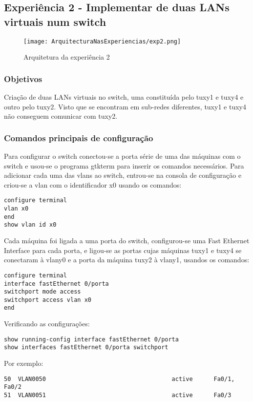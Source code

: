 \documentclass[a4paper]{article}
\begin{document}
\subsection{Experiência 2 - Implementar de duas LANs virtuais num switch}

\begin{figure}[h]
    \centering
    \texttt{[image: ArquitecturaNasExperiencias/exp2.png]}
    \caption{Arquitetura da experiência 2}
\end{figure}

\subsubsection{Objetivos}
Criação de duas LANs virtuais no switch, uma constituída pelo tuxy1 e tuxy4 e
outro pelo tuxy2. Visto que se encontram em sub-redes diferentes, tuxy1 e tuxy4
não conseguem comunicar com tuxy2.

\subsubsection{Comandos principais de configuração}
Para configurar o switch conectou-se a porta série de uma das máquinas com o
switch e usou-se o programa gtkterm para inserir os comandos necessários. Para
adicionar cada uma das vlans ao switch, entrou-se na consola de configuração e
criou-se a vlan com o identificador x0 usando os comandos:
\begin{verbatim}
configure terminal
vlan x0
end
show vlan id x0
\end{verbatim}
Cada máquina foi ligada a uma porta do switch, configurou-se uma Fast Ethernet
Interface para cada porta, e ligou-se as portas cujas máquinas tuxy1 e tuxy4 se
conectaram à vlany0 e a porta da máquina tuxy2 à vlany1, usandos os comandos:
\begin{verbatim}
configure terminal
interface fastEthernet 0/porta
switchport mode access
switchport access vlan x0
end
\end{verbatim}
Verificando as configurações:
\begin{verbatim}
show running-config interface fastEthernet 0/porta
show interfaces fastEthernet 0/porta switchport
\end{verbatim}

Por exemplo:
\begin{verbatim}
50	VLAN0050									active		Fa0/1, Fa0/2
51 	VLAN0051									active		Fa0/3
\end{verbatim}
\end{document}
